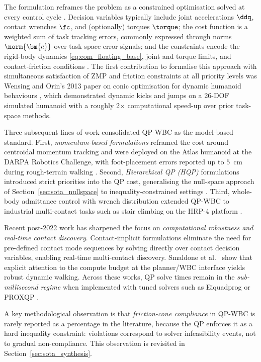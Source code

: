 The \QP{} formulation reframes the \WBC{} problem as a constrained
optimisation solved at every control cycle \cite{Wensing2013}. Decision
variables typically include joint accelerations $\ddq$, contact wrenches
$\fc$, and (optionally) torques $\torque$; the cost function is a
weighted sum of task tracking errors, commonly expressed through norms
$\norm{\bm{e}}$ over task-space error signals; and the constraints
encode the rigid-body dynamics \eqref{eq:eom_floating_base}, joint and
torque limits, and contact-friction conditions
\cite{Wensing2013,Koolen2016}. The first contribution to formalise this
approach with simultaneous satisfaction of ZMP and friction constraints
at all priority levels was Wensing and Orin's 2013 paper on conic
optimisation for dynamic humanoid behaviours \cite{Wensing2013}, which
demonstrated dynamic kicks and jumps on a 26-DOF simulated humanoid with
a roughly 2$\times$ computational speed-up over prior task-space methods.

Three subsequent lines of work consolidated QP-WBC as the model-based
standard. First, \emph{momentum-based formulations} \cite{Koolen2016}
reframed the cost around centroidal momentum tracking and were deployed
on the Atlas humanoid at the DARPA Robotics Challenge, with foot-placement
errors reported up to $5$~cm during rough-terrain walking \cite{Koolen2016}.
Second, \emph{Hierarchical QP (HQP)} formulations introduced strict
priorities into the QP cost, generalising the null-space approach of
Section~\ref{sec:sota_nullspace} to inequality-constrained settings
\cite{EscandeMansard2014}. Third, whole-body admittance control with
\QP{} wrench distribution extended QP-WBC to industrial multi-contact
tasks such as stair climbing on the HRP-4 platform \cite{Caron2019}.

Recent post-2022 work has sharpened the focus on \emph{computational
robustness and real-time contact discovery}. Contact-implicit \MPC{} formulations
\cite{LeCleach2024,Kim2025CI} eliminate the need for pre-defined contact
mode sequences by solving directly over contact decision variables, enabling
real-time multi-contact discovery. Smaldone et al.\
\cite{Smaldone2025} show that explicit attention to the compute budget
at the planner/WBC interface yields robust dynamic walking. Across these
works, QP solve times remain in the \emph{sub-millisecond regime} when
implemented with tuned solvers such as Eiquadprog or PROXQP \cite{DelPrete2016,Wensing2023Review}.

A key methodological observation is that \emph{friction-cone compliance}
in QP-WBC is rarely reported as a percentage in the literature, because
the QP enforces it as a hard inequality constraint: violations correspond
to solver infeasibility events, not to gradual non-compliance. This
observation is revisited in Section~\ref{sec:sota_synthesis}.

